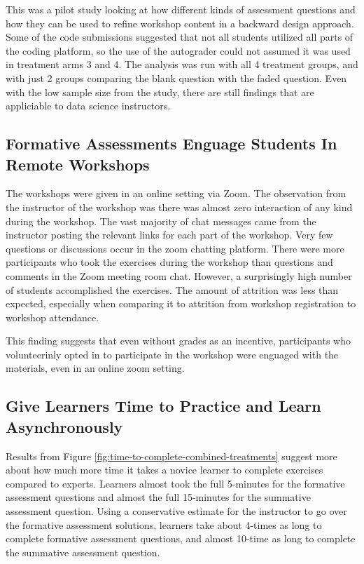 \documentclass[040-assessment.tex]{subfiles}
\begin{document}
    This was a pilot study looking at how different kinds of assessment questions
    and how they can be used to refine workshop content in a backward design approach.
    Some of the code submissions suggested that not all students utilized all parts of the
    coding platform,
    so the use of the autograder could not assumed it was used in treatment arms 3 and 4.
    The analysis was run with all 4 treatment groups, and with just 2 groups comparing
    the blank question with the faded question.
    Even with the low sample size from the study,
    there are still findings that are appliciable to data science instructors.

\subsection{Formative Assessments Enguage Students In Remote Workshops}

    The workshops were given in an online setting via Zoom.
    The observation from the instructor of the workshop was there was almost zero
    interaction of any kind during the workshop.
    The vast majority of chat messages came from the instructor posting the
    relevant links for each part of the workshop.
    Very few questions or discussions occur in the zoom chatting platform.
    There were more participants who took the exercises during the workshop than
    questions and comments in the Zoom meeting room chat.
    However, a surprisingly high number of students accomplished the exercises.
    The amount of attrition was less than expected,
    especially when comparing it to attrition from workshop registration to workshop attendance.

    This finding suggests that even without grades as an incentive,
    participants who volunteerinly opted in to participate in the workshop
    were enguaged with the materials, even in an online zoom setting.

\subsection{Give Learners Time to Practice and Learn Asynchronously}

    Results from Figure \ref{fig:time-to-complete-combined-treatments} suggest more about
    how much more time it takes a novice learner to complete exercises compared to experts.
    Learners almost took the full 5-minutes for the formative assessment questions and
    almost the full 15-minutes for the summative assessment question.
    Using a conservative estimate for the instructor to go over the formative assessment solutions,
    learners take about 4-times as long to complete formative assessment questions,
    and almost 10-time as long to complete the summative assessment question.
\end{document}
